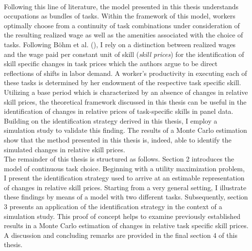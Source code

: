 \documentclass[../main.tex]{subfiles}
\begin{document}
\\
Following this line of literature, the model presented in this thesis understands occupations as bundles of tasks. Within the framework of this model, workers optimally choose from a continuity of task combinations under consideration of the resulting realized wage as well as the amenities associated with the choice of tasks. Following Böhm et al. (\citeyear{bohm2019occupation}), I rely on a distinction between realized wages and the wage paid per constant unit of skill (\textit{skill prices}) for the identification of skill specific changes in task prices which the authors argue to be direct reflections of shifts in labor demand. A worker's productivity in executing each of these tasks is determined by her endowment of the respective task specific skill.
\\
Utilizing a base period which is characterized by an absence of changes in relative skill prices, the theoretical framework discussed in this thesis can be useful in the identification of changes in relative prices of task-specific skills in panel data. Building on the identification strategy derived in this thesis, I employ a simulation study to validate this finding. The results of a Monte Carlo estimation show that the method presented in this thesis is, indeed, able to identify the simulated changes in relative skill prices.
\\
The remainder of this thesis is structured as follows. Section 2 introduces the model of continuous task choice. Beginning with a utility maximization problem, I present the identification strategy used to arrive at an estimable representation of changes in relative skill prices. Starting from a very general setting, I illustrate these findings by means of a model with two different tasks. Subsequently, section 3  presents an application of the identification strategy in the context of a simulation study. This proof of concept helps to examine previously established results in a Monte Carlo estimation of changes in relative task specific skill prices. A discussion and concluding remarks are provided in the final section 4 of this thesis.
\end{document}
